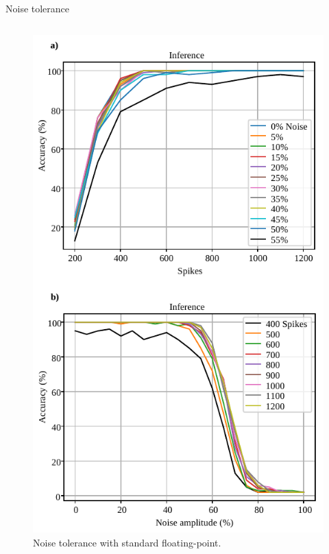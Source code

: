 \begin{frame}{Noise tolerance}
	\begin{columns}
		\begin{column}{0.33\textwidth}
			\centering
			\begin{figure}
			\includegraphics[width=0.75\linewidth]{../chapters/sbs_accelerator/figures/accuracy_vs_noise_pu_fp.pdf} %
			\caption{\scriptsize Noise tolerance with standard floating-point.}
			\end{figure}
			\pause
		\end{column}
		

\end{columns}
\end{frame}
